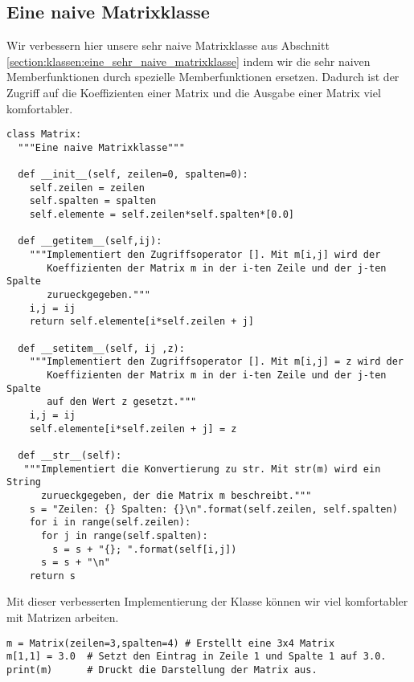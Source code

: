 \subsection{Eine naive Matrixklasse}
\label{section:klassen:eine_naive_matrixklasse}
Wir verbessern hier unsere sehr naive Matrixklasse aus Abschnitt \ref{section:klassen:eine_sehr_naive_matrixklasse}
indem wir die sehr naiven Memberfunktionen durch spezielle Memberfunktionen ersetzen.
Dadurch ist der Zugriff auf die Koeffizienten einer Matrix und die Ausgabe einer Matrix viel komfortabler.
\begin{lstlisting}
class Matrix:
  """Eine naive Matrixklasse"""
  
  def __init__(self, zeilen=0, spalten=0):
    self.zeilen = zeilen
    self.spalten = spalten
    self.elemente = self.zeilen*self.spalten*[0.0]
  
  def __getitem__(self,ij):
    """Implementiert den Zugriffsoperator []. Mit m[i,j] wird der
       Koeffizienten der Matrix m in der i-ten Zeile und der j-ten Spalte
       zurueckgegeben."""
    i,j = ij
    return self.elemente[i*self.zeilen + j]
  
  def __setitem__(self, ij ,z):
    """Implementiert den Zugriffsoperator []. Mit m[i,j] = z wird der
       Koeffizienten der Matrix m in der i-ten Zeile und der j-ten Spalte
       auf den Wert z gesetzt."""
    i,j = ij
    self.elemente[i*self.zeilen + j] = z
  
  def __str__(self):
   """Implementiert die Konvertierung zu str. Mit str(m) wird ein String
      zurueckgegeben, der die Matrix m beschreibt."""
    s = "Zeilen: {} Spalten: {}\n".format(self.zeilen, self.spalten)
    for i in range(self.zeilen):
      for j in range(self.spalten):
        s = s + "{}; ".format(self[i,j])
      s = s + "\n"
    return s
\end{lstlisting}
Mit dieser verbesserten Implementierung der Klasse  können wir viel komfortabler mit Matrizen arbeiten.
\begin{lstlisting}
m = Matrix(zeilen=3,spalten=4) # Erstellt eine 3x4 Matrix
m[1,1] = 3.0  # Setzt den Eintrag in Zeile 1 und Spalte 1 auf 3.0.
print(m)      # Druckt die Darstellung der Matrix aus.
\end{lstlisting}
